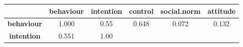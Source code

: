 \documentclass[]{article}
\theoremstyle{definition}
\theoremstyle{definition}
\theoremstyle{definition}
\theoremstyle{remark}
\begin{document}
\begin{longtable}[]{@{}cccccc@{}}
\toprule
\begin{minipage}[b]{0.20\columnwidth}\centering\strut
~\strut
\end{minipage} & \begin{minipage}[b]{0.13\columnwidth}\centering\strut
behaviour\strut
\end{minipage} & \begin{minipage}[b]{0.13\columnwidth}\centering\strut
intention\strut
\end{minipage} & \begin{minipage}[b]{0.11\columnwidth}\centering\strut
control\strut
\end{minipage} & \begin{minipage}[b]{0.15\columnwidth}\centering\strut
social.norm\strut
\end{minipage} & \begin{minipage}[b]{0.11\columnwidth}\centering\strut
attitude\strut
\end{minipage}\tabularnewline
\midrule
\endhead
\begin{minipage}[t]{0.20\columnwidth}\centering\strut
\textbf{behaviour}\strut
\end{minipage} & \begin{minipage}[t]{0.13\columnwidth}\centering\strut
1.000\strut
\end{minipage} & \begin{minipage}[t]{0.13\columnwidth}\centering\strut
0.55\strut
\end{minipage} & \begin{minipage}[t]{0.11\columnwidth}\centering\strut
0.648\strut
\end{minipage} & \begin{minipage}[t]{0.15\columnwidth}\centering\strut
0.072\strut
\end{minipage} & \begin{minipage}[t]{0.11\columnwidth}\centering\strut
0.132\strut
\end{minipage}\tabularnewline
\begin{minipage}[t]{0.20\columnwidth}\centering\strut
\textbf{intention}\strut
\end{minipage} & \begin{minipage}[t]{0.13\columnwidth}\centering\strut
0.551\strut
\end{minipage} & \begin{minipage}[t]{0.13\columnwidth}\centering\strut
1.00\strut
\end{minipage} & \begin{minipage}[t]{0.11\columnwidth}\centering\strut

\end{minipage}
\end{longtable}
\end{document}

